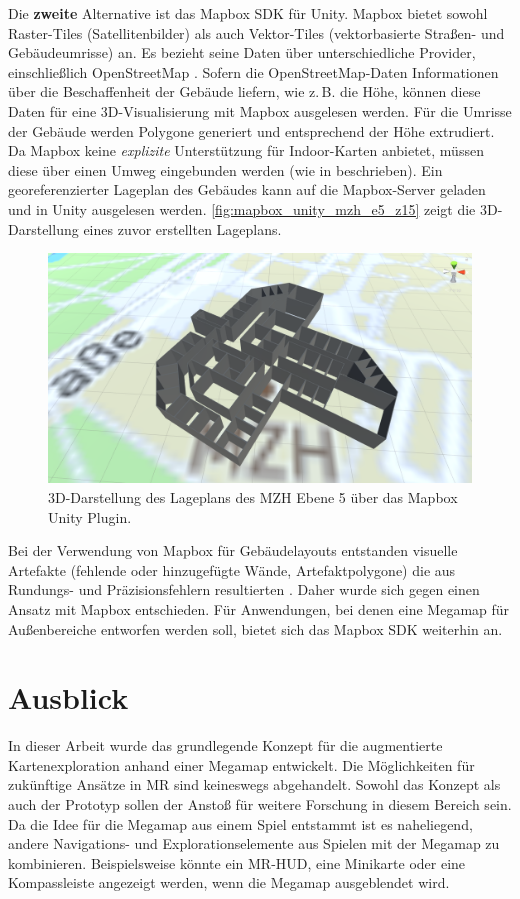 Die \textbf{zweite} Alternative ist das Mapbox SDK für Unity.
Mapbox bietet sowohl Raster-Tiles (Satellitenbilder) als auch Vektor-Tiles (vektorbasierte Straßen- und Gebäudeumrisse) an.
Es bezieht seine Daten über unterschiedliche Provider, einschließlich OpenStreetMap \autocite{Mapbox2018}.
Sofern die OpenStreetMap-Daten Informationen über die Beschaffenheit der Gebäude liefern, wie z.\,B. die Höhe, können diese Daten für eine 3D-Visualisierung mit Mapbox ausgelesen werden.
Für die Umrisse der Gebäude werden Polygone generiert und entsprechend der Höhe extrudiert.
Da Mapbox keine \emph{explizite} Unterstützung für Indoor-Karten anbietet, müssen diese über einen Umweg eingebunden werden (wie in \cite{Mapbox2018b, Pavani2018, Clarke2017} beschrieben).
Ein georeferenzierter Lageplan des Gebäudes kann auf die Mapbox-Server geladen und in Unity ausgelesen werden.
\autoref{fig:mapbox_unity_mzh_e5_z15} zeigt die 3D-Darstellung eines zuvor erstellten Lageplans.
\begin{figure}[h]
    \centering
    \includegraphics[width=0.65\linewidth]{figures/mapbox_unity_mzh_e5_z15_working}
    \caption{3D-Darstellung des Lageplans des MZH Ebene 5 über das Mapbox Unity Plugin.}
    \label{fig:mapbox_unity_mzh_e5_z15}
\end{figure}
Bei der Verwendung von Mapbox für Gebäudelayouts entstanden visuelle Artefakte (fehlende oder hinzugefügte Wände, Artefaktpolygone) die aus Rundungs- und Präzisionsfehlern resultierten \parencite{Kahyaoglu2017, Mapbox2018c}.
Daher wurde sich gegen einen Ansatz mit Mapbox entschieden.
Für Anwendungen, bei denen eine Megamap für Außenbereiche entworfen werden soll, bietet sich das Mapbox SDK weiterhin an.

\section{Ausblick}
In dieser Arbeit wurde das grundlegende Konzept für die augmentierte Kartenexploration anhand einer Megamap entwickelt.
Die Möglichkeiten für zukünftige Ansätze in MR sind keineswegs abgehandelt.
Sowohl das Konzept als auch der Prototyp sollen der Anstoß für weitere Forschung in diesem Bereich sein.
Da die Idee für die Megamap aus einem Spiel entstammt ist es naheliegend, andere Navigations- und Explorationselemente aus Spielen mit der Megamap zu kombinieren.
Beispielsweise könnte ein MR-HUD, eine Minikarte oder eine Kompassleiste angezeigt werden, wenn die Megamap ausgeblendet wird.

